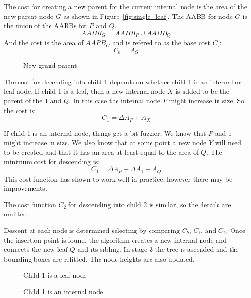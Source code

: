 \documentclass{article}
\begin{document}
The cost for creating a new parent for the current internal node is the area of the new parent node $G$ as shown in Figure~\ref{fig:single_leaf}. The AABB for node $G$ is the union of the AABBs for $P$ and $Q$.
\[AABB_G = AABB_P \cup AABB_Q \]
And the cost is the area of $AABB_G$ and is refered to as the base cost $C_b$:
\[ C_b = A_G \]

\begin{figure}
	\begin{center}
		
	\end{center}
	\caption{New grand parent}
	\label{fig:grand_parent}
\end{figure}

The cost for decending into child 1 depends on whether child 1 is an internal or leaf node. If child 1 is a leaf, then a new internal node $X$ is added to be the parent of the $1$ and $Q$. In this case the internal node $P$ might increase in size. So the cost is:
\[ C_1 = \Delta A_P + A_X \]

If child 1 is an internal node, things get a bit fuzzier. We know that $P$ and $1$ might increase in size. We also know that at some point a new node $Y$ will need to be created and that it has an area at least equal to the area of $Q$. The minimum cost for descending is:
\[ C_1 = \Delta A_P + \Delta A_1 + A_Q \]
This cost function has shown to work well in practice, however there may be improvements.

The cost function $C_2$ for descending into child 2 is similar, so the details are omitted.

Descent at each node is determined selecting by comparing $C_b$, $C_1$, and $C_2$. Once the insertion point is found, the algorithm creates a new internal node and connects the new leaf $Q$ and its sibling. In stage 3 the tree is ascended and the bounding boxes are refitted. The node heights are also updated.

\begin{figure}
	\begin{center}
		
	\end{center}
	\caption{Child 1 is a leaf node}
	\label{fig:child1_leaf}
\end{figure}

\begin{figure}
	\begin{center}
		
	\end{center}
	\caption{Child 1 is an internal node}
	\label{fig:child1_internal}
\end{figure}
\end{document}
